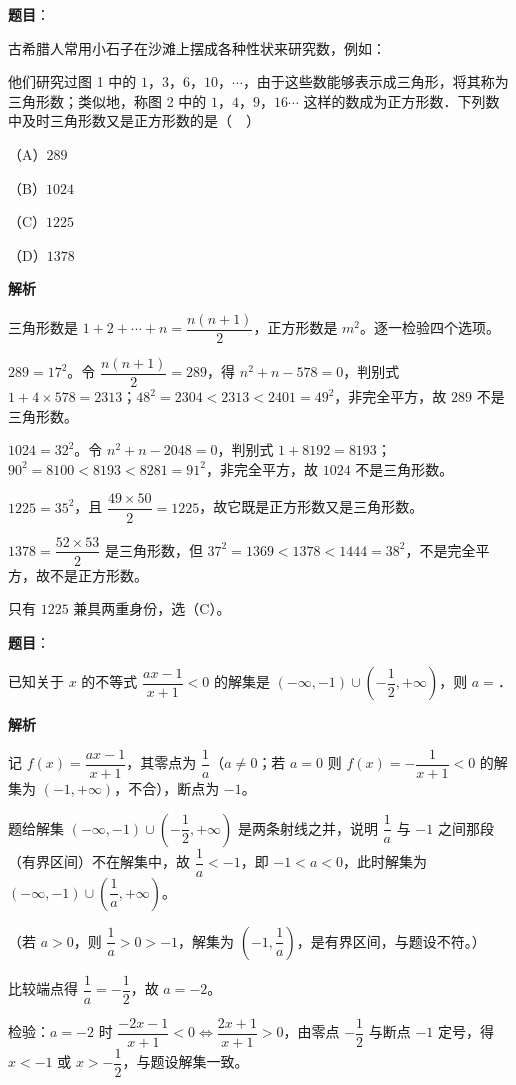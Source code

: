 \begin{answer}

\textbf{题目}：

古希腊人常用小石子在沙滩上摆成各种性状来研究数，例如：
\nopagebreak[4]
\begin{center}\end{center}
\nopagebreak[4]
他们研究过图 1 中的 $1$，$3$，$6$，$10$，$\cdots$，由于这些数能够表示成三角形，将其称为三角形数；类似地，称图 2 中的 $1$，$4$，$9$，$16\cdots$ 这样的数成为正方形数．下列数中及时三角形数又是正方形数的是（　）

（A）$289$

（B）$1024$

（C）$1225$

（D）$1378$

\textbf{解析}

三角形数是 $1+2+\cdots+n=\dfrac{n(n+1)}2$，正方形数是 $m^2$。逐一检验四个选项。

$289=17^2$。令 $\dfrac{n(n+1)}2=289$，得 $n^2+n-578=0$，判别式 $1+4\times578=2313$；$48^2=2304<2313<2401=49^2$，非完全平方，故 $289$ 不是三角形数。

$1024=32^2$。令 $n^2+n-2048=0$，判别式 $1+8192=8193$；$90^2=8100<8193<8281=91^2$，非完全平方，故 $1024$ 不是三角形数。

$1225=35^2$，且 $\dfrac{49\times50}{2}=1225$，故它既是正方形数又是三角形数。

$1378=\dfrac{52\times53}{2}$ 是三角形数，但 $37^2=1369<1378<1444=38^2$，不是完全平方，故不是正方形数。

只有 $1225$ 兼具两重身份，选（C）。


\end{answer}
\begin{answer}

\textbf{题目}：

已知关于 $x$ 的不等式 $\dfrac{ax-1}{x+1}<0$ 的解集是 $(-\infty,-1)\cup\left(-\dfrac12,+\infty\right)$，则 $a=$\gkblank{}．

\textbf{解析}

记 $f(x)=\dfrac{ax-1}{x+1}$，其零点为 $\dfrac1a$（$a\neq0$；若 $a=0$ 则 $f(x)=-\dfrac1{x+1}<0$ 的解集为 $(-1,+\infty)$，不合），断点为 $-1$。

题给解集 $(-\infty,-1)\cup\left(-\dfrac12,+\infty\right)$ 是两条射线之并，说明 $\dfrac1a$ 与 $-1$ 之间那段（有界区间）不在解集中，故 $\dfrac1a<-1$，即 $-1<a<0$，此时解集为 $(-\infty,-1)\cup\left(\dfrac1a,+\infty\right)$。

（若 $a>0$，则 $\dfrac1a>0>-1$，解集为 $\left(-1,\dfrac1a\right)$，是有界区间，与题设不符。）

比较端点得 $\dfrac1a=-\dfrac12$，故 $a=-2$。

检验：$a=-2$ 时 $\dfrac{-2x-1}{x+1}<0\iff\dfrac{2x+1}{x+1}>0$，由零点 $-\dfrac12$ 与断点 $-1$ 定号，得 $x<-1$ 或 $x>-\dfrac12$，与题设解集一致。


\end{answer}
